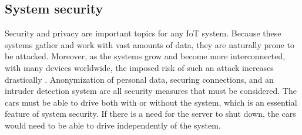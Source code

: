 \subsection{System security}
Security and privacy are important topics for any IoT system. Because these systems gather and work with vast amounts of data, they are naturally prone to be attacked. Moreover, as the systems grow and become more interconnected, with many devices worldwide, the imposed risk of such an attack increases drastically \parencite{iot_risk}. Anonymization of personal data, securing connections, and an intruder detection system are all security measures that must be considered. The cars must be able to drive both with or without the system, which is an essential feature of system security. If there is a need for the server to shut down, the cars would need to be able to drive independently of the system.